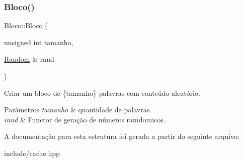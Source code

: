 \subsubsection{\texorpdfstring{Bloco()}{Bloco()}\hspace{0.1cm}{\footnotesize\ttfamily [2/2]}}
{\footnotesize\ttfamily Bloco\+::\+Bloco (\begin{DoxyParamCaption}\item[{unsigned int}]{tamanho,  }\item[{\hyperlink{structRandom}{Random} \&}]{rand }\end{DoxyParamCaption})\hspace{0.3cm}{\ttfamily [inline]}}



Criar um bloco de \{tamanho\} palavras com conteúdo aleatório. 


\begin{DoxyParams}{Parâmetros}
{\em tamanho} & quantidade de palavras. \\
\hline
{\em rand} & Functor de geração de números ramdomicos. \\
\hline
\end{DoxyParams}


A documentação para esta estrutura foi gerada a partir do seguinte arquivo\+:\begin{DoxyCompactItemize}
\item 
include/cache.\+hpp\end{DoxyCompactItemize}
